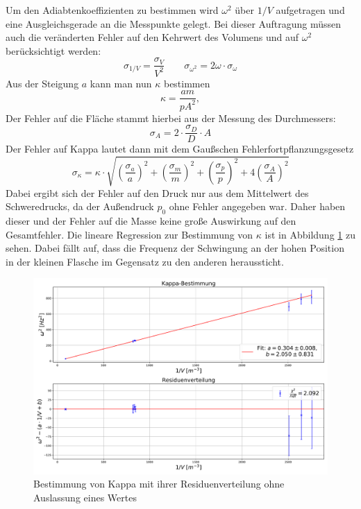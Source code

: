 \documentclass[a4paper, 11pt]{article}
\begin{document}
Um den Adiabtenkoeffizienten zu bestimmen wird $\omega^2$ über $1/V$ aufgetragen und eine Ausgleichsgerade an die Messpunkte gelegt.
Bei dieser Auftragung müssen auch die veränderten Fehler auf den Kehrwert des Volumens und auf $\omega^2$ berücksichtigt werden:
\begin{equation}
\sigma_{1/V} = \frac{\sigma_V}{V^2} \qquad \sigma_{\omega^2} = 2 \omega \cdot \sigma_{\omega}
\end{equation}
Aus der Steigung $a$ kann man nun $\kappa$ bestimmen
\begin{equation}
\kappa = \frac{a m}{p A^2},
\end{equation}
Der Fehler auf die Fläche stammt hierbei aus der Messung des Durchmessers:
\begin{equation}
\sigma_A = 2 \cdot \frac{\sigma_D}{D} \cdot A
\end{equation}
Der Fehler auf Kappa lautet dann mit dem Gaußschen Fehlerfortpflanzungsgesetz
\begin{equation}
\sigma_{\kappa} = \kappa \cdot \sqrt{\left(\frac{\sigma_a}{a}\right)^2 + \left(\frac{\sigma_m}{m}\right)^2 + \left(\frac{\sigma_p}{p}\right)^2 + 4 \left(\frac{\sigma_A}{A}\right)^2}
\end{equation}
Dabei ergibt sich der Fehler auf den Druck nur aus dem Mittelwert des Schweredrucks, da der Außendruck $p_0$ ohne Fehler angegeben war. Daher haben dieser und der Fehler auf die Masse keine große Auswirkung auf den Gesamtfehler.
Die lineare Regression zur Bestimmung von $\kappa$ ist in Abbildung \ref{fig:Linregress} zu sehen. Dabei fällt auf, dass die Frequenz der Schwingung an der hohen Position in der kleinen Flasche im Gegensatz zu den anderen heraussticht.

\begin{figure}[H]
	\centering
	\includegraphics[scale=0.4]{../Plots/Kappa-Bestimmung_mitWert_NEU.pdf}
	\caption{Bestimmung von Kappa mit ihrer Residuenverteilung ohne Auslassung eines Wertes}
	\label{fig:Linregress}
\end{figure}
\end{document}
